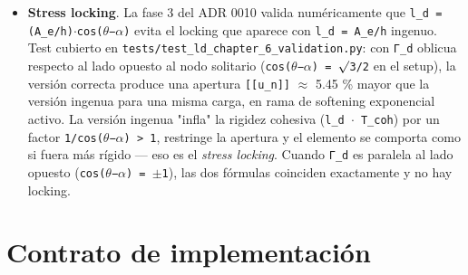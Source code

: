 \documentclass[11pt,letterpaper,oneside]{report}
\begin{document}
\begin{itemize}
  \item \textbf{Stress locking}. La fase 3 del ADR 0010 valida numéricamente que \texttt{l\_d = (A\_e/h)\ensuremath{\cdot}cos(\ensuremath{\theta}−\ensuremath{\alpha})} evita el locking que aparece con \texttt{l\_d = A\_e/h} ingenuo. Test cubierto en \texttt{tests/test\_ld\_chapter\_6\_validation.py}: con \texttt{Γ\_d} oblicua respecto al lado opuesto al nodo solitario (\texttt{cos(\ensuremath{\theta}−\ensuremath{\alpha}) = \ensuremath{\surd}3/2} en el setup), la versión correcta produce una apertura \texttt{[[u\_n]]} \ensuremath{\approx} 5.45 \% mayor que la versión ingenua para una misma carga, en rama de softening exponencial activo. La versión ingenua "infla" la rigidez cohesiva (\texttt{l\_d \ensuremath{\cdot} T\_coh}) por un factor \texttt{1/cos(\ensuremath{\theta}−\ensuremath{\alpha}) > 1}, restringe la apertura y el elemento se comporta como si fuera más rígido --- eso es el \textit{stress locking}. Cuando \texttt{Γ\_d} es paralela al lado opuesto (\texttt{cos(\ensuremath{\theta}−\ensuremath{\alpha}) = \ensuremath{\pm}1}), las dos fórmulas coinciden exactamente y no hay locking.
\end{itemize}


\section{Contrato de implementación}
\end{document}
